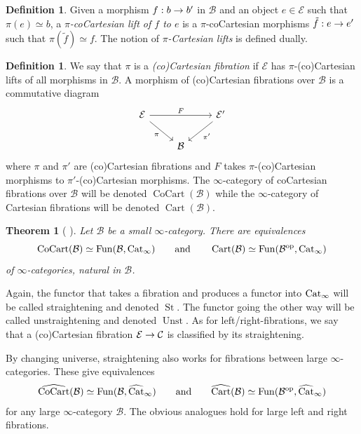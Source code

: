 \documentclass[10pt]{amsart}
\numberwithin{equation}{section}
\newtheorem{theorem}[prop]{Theorem}
\theoremstyle{definition}
\newtheorem{definition}[prop]{Definition}
\DeclareMathOperator{\Fun}{Fun}
\DeclareMathOperator{\op}{op}
\DeclareMathOperator{\St}{St}
\DeclareMathOperator{\Unst}{Unst}
\DeclareMathOperator{\CoCart}{CoCart}
\DeclareMathOperator{\Cart}{Cart}
\newcommand{\Cat}{\mathrm{Cat}\vphantom{t}}
\newcommand{\CatHat}{\widehat{\mathrm{Cat}}\vphantom{t}}
\newcommand{\cB}{\mathcal{B}}
\newcommand{\cC}{\mathcal{C}}
\newcommand{\cE}{\mathcal{E}}
\renewcommand{\to}{\mathchoice{\longrightarrow}{\rightarrow}{}{}}
\begin{document}
	\begin{definition}\label{def:cocart_lift}
		Given a morphism $f : b \to b'$ in $\cB$ and an object $e \in \cE$ such that $\pi(e) \simeq b$, a \emph{$\pi$-coCartesian lift of $f$ to $e$} is a $\pi$-coCartesian morphisms $\tilde{f} : e \to e'$ such that $\pi(\tilde{f}) \simeq f$.
		The notion of \emph{$\pi$-Cartesian lifts} is defined dually.
	\end{definition}

	\begin{definition}\label{def:cocart_fib}
		We say that $\pi$ is a \emph{(co)Cartesian fibration} if $\cE$ has $\pi$-(co)Cartesian lifts of all morphisms in $\cB$.
		A morphism of (co)Cartesian fibrations over $\cB$ is a commutative diagram
		\[
		\begin{tikzcd}
			\cE \arrow[rr,"F"] \arrow[dr,"\pi"'] & & \cE' \arrow[dl,"\pi'"] \\
			& \cB
		\end{tikzcd}
		\]
		where $\pi$ and $\pi'$ are (co)Cartesian fibrations and $F$ takes $\pi$-(co)Cartesian morphisms to $\pi'$-(co)Cartesian morphisms.
		The $\infty$-category of coCartesian fibrations over $\cB$ will be denoted $\CoCart(\cB)$ while the $\infty$-category of Cartesian fibrations will be denoted $\Cart(\cB)$.
	\end{definition}

	\begin{theorem}[{\cite{HTT} }]\label{prop:straightening_cocart}
		Let $\cB$ be a small $\infty$-category. There are equivalences
		\[
		\CoCart(\mathcal{B}) \simeq \Fun(\mathcal{B},\Cat_{\infty}) \qquad \text{and} \qquad \Cart(\mathcal{B}) \simeq \Fun(\mathcal{B}^{\op},\Cat_{\infty})
		\]
		of $\infty$-categories, natural in $\cB$.
	\end{theorem}

	Again, the functor that takes a fibration and produces a functor into $\Cat_{\infty}$ will be called straightening and denoted $\St$.
	The functor going the other way will be called unstraightening and denoted $\Unst$.
  As for left/right-fibrations, we say that a (co)Cartesian fibration $\cE\to \cC$ is classified by its straightening.

	By changing universe, straightening also works for fibrations between large $\infty$-categories.
  These give equivalences
	\begin{align*}
		\widehat{\CoCart}(\cB) \simeq \Fun(\cB,\CatHat_{\infty}) \qquad \text{and} \qquad \widehat{\Cart}(\cB) \simeq \Fun(\mathcal{B}^{\op},\widehat{\Cat}_{\infty})
	\end{align*}
	for any large $\infty$-category $\cB$.
  The obvious analogues hold for large left and right fibrations.
\end{document}
